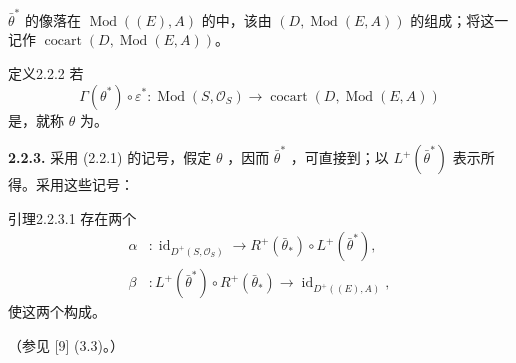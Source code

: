$\bar\theta^*$ 的像落在 $\operatorname{Mod}((E),A)$ 的中，该由 $(D,\operatorname{Mod}(E,A))$ 的组成；将这一记作 $\operatorname{cocart}(D,\operatorname{Mod}(E,A))$。

\begin{SGAresult}{定义}{2.2.2}
若
\[
\Gamma(\theta^*)\circ\varepsilon^*:\operatorname{Mod}(S,\mathcal O_S)
\longrightarrow\operatorname{cocart}(D,\operatorname{Mod}(E,A))
\]
是，就称 $\theta$ 为。
\end{SGAresult}
\textbf{2.2.3.} 采用 (2.2.1) 的记号，假定 $\theta$ ，因而 $\bar\theta^*$ ，可直接到；以 $L^+(\bar\theta^*)$ 表示所得。采用这些记号：
\begin{SGAresult}{引理}{2.2.3.1}
存在两个
\[
\begin{aligned}
\alpha &: \operatorname{id}_{D^+(S,\mathcal O_S)}\longrightarrow R^+(\bar\theta_*)\circ L^+(\bar\theta^*),\\
\beta &: L^+(\bar\theta^*)\circ R^+(\bar\theta_*)\longrightarrow\operatorname{id}_{D^+((E),A)},
\end{aligned}
\]
使这两个构成。
\end{SGAresult}
（参见 [9] (3.3)。）

